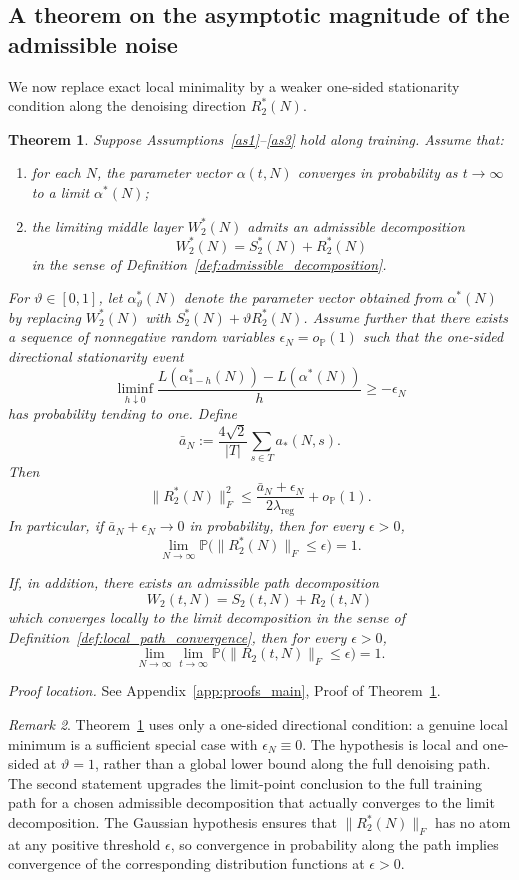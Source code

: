 \documentclass[11pt]{article}
\theoremstyle{plain}
\newtheorem{thm}{Theorem}[section]
\theoremstyle{definition}
\theoremstyle{remark}
\newtheorem{rem}[thm]{Remark}
\newcommand{\PP}{\mathbb{P}}
\newcommand{\1}{\mathbf{1}}
\newcommand{\proofloc}[1]{\par\noindent\emph{Proof location.} #1\par}
\begin{document}
\subsection{A theorem on the asymptotic magnitude of the admissible noise}

We now replace exact local minimality by a weaker one-sided stationarity condition along the denoising direction \(R_2^*(N)\).

\begin{thm}
\label{main_result_reducing_noise}
Suppose Assumptions~\ref{as1}--\ref{as3} hold along training. Assume that:
\begin{enumerate}[leftmargin=2em]
\item for each \(N\), the parameter vector \(\alpha(t,N)\) converges in probability as \(t\to\infty\) to a limit \(\alpha^*(N)\);
\item the limiting middle layer \(W_2^*(N)\) admits an admissible decomposition
\[
W_2^*(N)=S_2^*(N)+R_2^*(N)
\]
in the sense of Definition~\ref{def:admissible_decomposition}.
\end{enumerate}
\noindent For \(\vartheta\in[0,1]\), let \(\alpha_\vartheta^*(N)\) denote the parameter vector obtained from \(\alpha^*(N)\) by replacing \(W_2^*(N)\) with \(S_2^*(N)+\vartheta R_2^*(N)\). Assume further that there exists a sequence of nonnegative random variables \(\epsilon_N=o_{\PP}(1)\) such that the one-sided directional stationarity event
\[
\liminf_{h\downarrow0}
\frac{
L(\alpha_{1-h}^*(N))-L(\alpha^*(N))
}{h}
\ge -\epsilon_N
\]
has probability tending to one.
Define
\[
\bar a_N:=\frac{4\sqrt{2}}{|T|}\sum_{s\in T}a_*(N,s).
\]
Then
\[
\|R_2^*(N)\|_F^2
\le
\frac{\bar a_N+\epsilon_N}{2\lambda_{\mathrm{reg}}}
+o_{\PP}(1).
\]
In particular, if \(\bar a_N+\epsilon_N\to0\) in probability, then for every \(\epsilon>0\),
\[
\lim_{N\to\infty}\PP\big(\|R_2^*(N)\|_F\le \epsilon\big)=1.
\]

If, in addition, there exists an admissible path decomposition
\[
W_2(t,N)=S_2(t,N)+R_2(t,N)
\]
which converges locally to the limit decomposition in the sense of Definition~\ref{def:local_path_convergence}, then for every \(\epsilon>0\),
\[
\lim_{N\to\infty}\lim_{t\to\infty}\PP\big(\|R_2(t,N)\|_F\le \epsilon\big)=1.
\]
\end{thm}
\proofloc{See Appendix~\ref{app:proofs_main}, Proof of Theorem~\ref{main_result_reducing_noise}.}

\begin{rem}
Theorem~\ref{main_result_reducing_noise} uses only a one-sided directional condition: a genuine local minimum is a sufficient special case with \(\epsilon_N\equiv0\). The hypothesis is local and one-sided at \(\vartheta=1\), rather than a global lower bound along the full denoising path. The second statement upgrades the limit-point conclusion to the full training path for a chosen admissible decomposition that actually converges to the limit decomposition. The Gaussian hypothesis ensures that \(\|R_2^*(N)\|_F\) has no atom at any positive threshold \(\epsilon\), so convergence in probability along the path implies convergence of the corresponding distribution functions at \(\epsilon>0\).
\end{rem}
\end{document}
